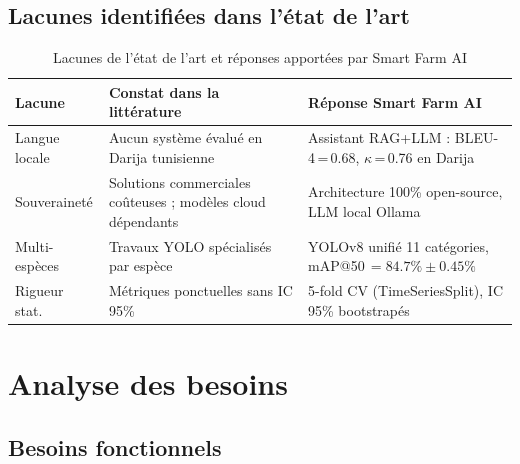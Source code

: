\documentclass[12pt,a4paper,twoside]{report}
\newcounter{hi}
\begin{document}
\subsection{Lacunes identifiées dans l'état de l'art}

\begin{table}[H]
\centering
\caption{Lacunes de l'état de l'art et réponses apportées par Smart Farm AI}
\label{tab:lacunes_etat_art}
\begin{tabularx}{\linewidth}{lXX}
\toprule
\textbf{Lacune} & \textbf{Constat dans la littérature} & \textbf{Réponse Smart Farm AI} \\
\midrule
Langue locale &
  Aucun système évalué en Darija tunisienne~\cite{abbou2024arabic} &
  Assistant RAG+LLM : BLEU-4\,=\,0.68, $\kappa$\,=\,0.76 en Darija \\
\addlinespace
Souveraineté &
  Solutions commerciales coûteuses ; modèles cloud dépendants &
  Architecture 100\% open-source, LLM local Ollama \\
\addlinespace
Multi-espèces &
  Travaux YOLO spécialisés par espèce~\cite{chen2023yolo_livestock} &
  YOLOv8 unifié 11 catégories, mAP@50\,$= 84.7\% \pm 0.45\%$ \\
\addlinespace
Rigueur stat. &
  Métriques ponctuelles sans IC 95\%~\cite{liakos2018} &
  5-fold CV (TimeSeriesSplit), IC 95\% bootstrapés \\
\bottomrule
\end{tabularx}
\end{table}

\section{Analyse des besoins}

\subsection{Besoins fonctionnels}
\end{document}
